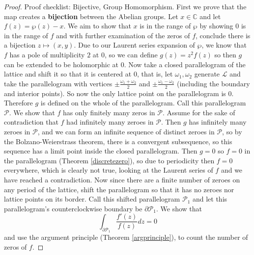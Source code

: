 \documentclass[10pt,a4paper]{amsart}
\newcommand{\C}{\mathbb{C}}
\begin{document}
\begin{proof} Proof checklist: Bijective, Group Homomorphism.
\newline\newline
First we prove that the map creates a \textbf{bijection} between the Abelian groups. 
\newline\newline
Let $x\in\C$ and let $f(z)=\wp(z)-x$. We aim to show that $x$ is in the range of $\wp$ by showing $0$ is in the range of $f$ and with further examination of the zeros of $f$, conclude there is a bijection $z\mapsto (x,y)$.
\newline\newline
Due to our Laurent series expansion of $\wp$, we know that $f$ has a pole of multiplicity $2$ at $0$, so we can define $g(z)=z^2f(z)$ so then $g$ can be extended to be holomorphic at $0$. Now take a closed parallelogram of the lattice and shift it so that it is centered at $0$, that is,  let $\omega_1,\omega_2$ generate $\mathcal{L}$ and take the parallelogram with vertices $\pm\frac{\omega_1+\omega_2}{2}$ and $\pm\frac{\omega_1-\omega_2}{2}$ (including the boundary and interior points). So now the only lattice point on the parallelogram is $0$. Therefore $g$ is defined on the whole of the parallelogram. Call this parallelogram $\mathcal{P}$.
\newline\newline
We show that $f$ has only finitely many zeros in $\mathcal{P}$.
Assume for the sake of contradiction that $f$ had infinitely many zeroes in $\mathcal{P}$. Then $g$ has infinitely many zeroes in $\mathcal{P}$, and we can form an infinite sequence of distinct zeroes in $\mathcal{P}$, so by the Bolzano-Weierstrass theorem, there is a convergent subsequence, so this sequence has a limit point inside the closed parallelogram. Then $g=0$ so $f=0$ in the parallelogram (Theorem \ref{discretezero}), so due to periodicity then $f=0$ everywhere, which is clearly not true, looking at the Laurent series of $f$ and we have reached a contradiction.
\newline\newline
Now since there are a finite number of zeroes on any period of the lattice, shift the parallelogram so that it has no zeroes nor lattice points on its border. Call this shifted parallelogram $\mathcal{P}_1$ and let this parallelogram's counterclockwise boundary be $\partial \mathcal{P}_1$. We show that
$$\int_{\partial \mathcal{P}_1} \frac{f'(z)}{f(z)} dz=0$$
and use the argument principle (Theorem \ref{argprinciple}), to count the number of zeros of $f$.

\end{proof}
\end{document}
